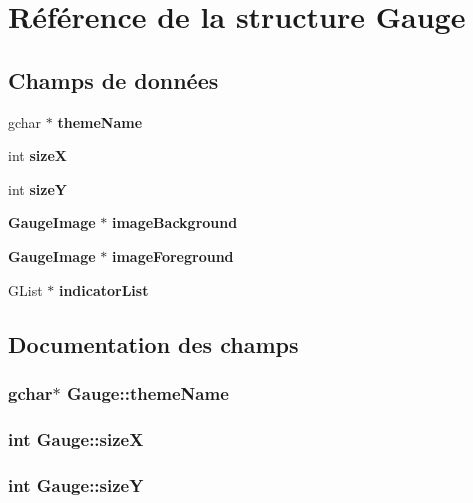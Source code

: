 \section{Référence de la structure Gauge}
\label{structGauge}
\subsection*{Champs de données}
\begin{CompactItemize}
\item 
gchar $\ast$ {\bf themeName}
\item 
int {\bf sizeX}
\item 
int {\bf sizeY}
\item 
{\bf GaugeImage} $\ast$ {\bf imageBackground}
\item 
{\bf GaugeImage} $\ast$ {\bf imageForeground}
\item 
GList $\ast$ {\bf indicatorList}
\end{CompactItemize}


\subsection{Documentation des champs}
\subsubsection{\setlength{\rightskip}{0pt plus 5cm}gchar$\ast$ {\bf Gauge::themeName}}\label{structGauge_bcfa5cc670fb5a43c6d6cc0affdb0245}


\subsubsection{\setlength{\rightskip}{0pt plus 5cm}int {\bf Gauge::sizeX}}\label{structGauge_89aac91489003c0feba4f00a7c6eb301}


\subsubsection{\setlength{\rightskip}{0pt plus 5cm}int {\bf Gauge::sizeY}}\label{structGauge_139c8d5b4d31af4c8e0757799d2e4d67}


